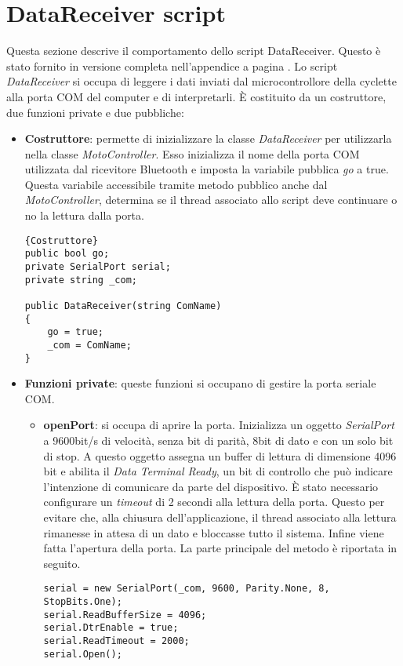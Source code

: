 \section{DataReceiver script}
Questa sezione descrive il comportamento dello script DataReceiver. Questo è stato fornito in versione completa nell'appendice  a pagina \pageref{receiver}. Lo script \textit{DataReceiver} si occupa di leggere i dati inviati dal microcontrollore della cyclette alla porta COM del computer e di interpretarli. È costituito da un costruttore, due funzioni private e due pubbliche:
\begin{itemize}
  \item \textbf{Costruttore}: permette di inizializzare la classe \textit{DataReceiver} per utilizzarla nella classe \textit{MotoController}. Esso inizializza il nome della porta COM utilizzata dal ricevitore Bluetooth e imposta la variabile pubblica \textit{go} a true. Questa variabile accessibile tramite metodo pubblico anche dal \textit{MotoController}, determina se il thread associato allo script deve continuare o no la lettura dalla porta.
\begin{lstlisting}{Costruttore}
public bool go;
private SerialPort serial;
private string _com;

public DataReceiver(string ComName) 
{
	go = true;
	_com = ComName;
}
\end{lstlisting}

  \item \textbf{Funzioni private}: queste funzioni si occupano di gestire la porta seriale COM.
\begin{itemize}
   \item \textbf{openPort}: si occupa di aprire la porta. Inizializza un oggetto \textit{SerialPort} a 9600bit/s di velocità, senza bit di parità, 8bit di dato e con un solo bit di stop. A questo oggetto assegna un buffer di lettura di dimensione 4096 bit e abilita il \textit{Data Terminal Ready}, un bit di controllo che può indicare l'intenzione di comunicare da parte del dispositivo. È stato necessario configurare un \textit{timeout} di 2 secondi alla lettura della porta. Questo per evitare che, alla chiusura dell'applicazione, il thread associato alla lettura rimanesse in attesa di un dato e bloccasse tutto il sistema. Infine viene fatta l'apertura della porta. La parte principale del metodo è riportata in seguito.
\begin{lstlisting}
serial = new SerialPort(_com, 9600, Parity.None, 8, StopBits.One);
serial.ReadBufferSize = 4096;
serial.DtrEnable = true;
serial.ReadTimeout = 2000; 		
serial.Open();
\end{lstlisting}


\end{itemize}
\end{itemize}
